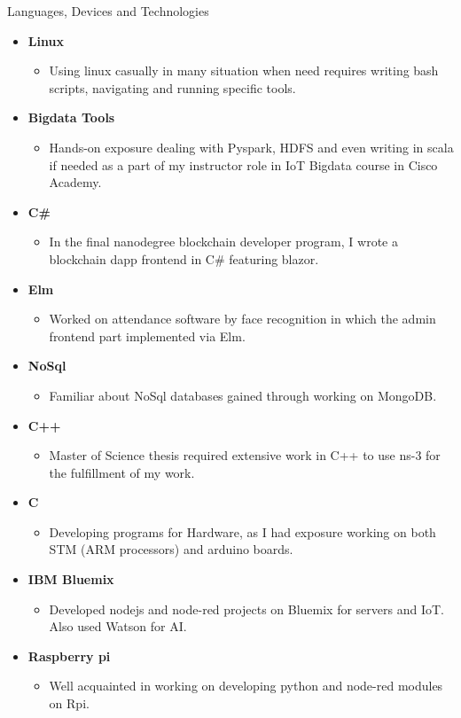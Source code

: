 \documentclass[]{mcdowellcv}
\begin{document}
\begin{cvsection}{Languages, Devices and Technologies}
\begin{cvsubsection}{}{}{}
\begin{itemize}
                     \item \textbf{Linux}
				\begin{itemize}
					\item Using linux casually in many situation when need requires writing bash scripts, navigating and running specific tools. 
				\end{itemize}
				\item \textbf{Bigdata Tools}
				\begin{itemize}
					\item Hands-on exposure dealing with Pyspark, HDFS and even writing in scala if needed as a part of my instructor role in IoT Bigdata course in Cisco Academy.
				\end{itemize}
				\item \textbf{C\#}
				\begin{itemize}
					\item In the final nanodegree blockchain developer program, I wrote a blockchain dapp frontend in C\# featuring blazor.
				\end{itemize}
				\item \textbf{Elm}
				\begin{itemize}
					\item Worked on attendance software by face recognition in which the admin frontend part implemented via Elm.
				\end{itemize}
				\item \textbf{NoSql}
				\begin{itemize}
					\item Familiar about NoSql databases gained through working on MongoDB.
				\end{itemize}
				\item \textbf{C++}
				\begin{itemize}
					\item Master of Science thesis required extensive work in C++ to use ns-3 for the fulfillment of my work.
				\end{itemize}
				\item \textbf{C}
				\begin{itemize}
					\item Developing programs for Hardware, as I had exposure working on both STM (ARM processors) and arduino boards.
                \end{itemize}
				\item \textbf{IBM Bluemix}
				\begin{itemize}
					\item Developed nodejs and node-red projects on Bluemix for servers and IoT. Also used Watson for AI.
                                     \end{itemize}
                                     \item \textbf{Raspberry pi}
				\begin{itemize}
					\item Well acquainted in working on developing python and node-red modules on Rpi.
				\end{itemize}
				

\end{itemize}
\end{cvsubsection}
\end{cvsection}
\end{document}
